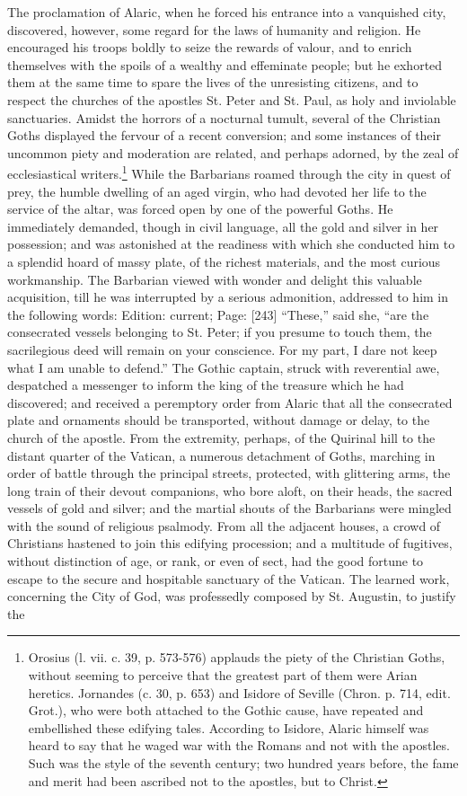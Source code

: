 The proclamation of Alaric, when he forced his entrance into a vanquished city, discovered, however, some regard for the laws of humanity and religion. He encouraged his troops boldly to seize the rewards of valour, and to enrich themselves with the spoils of a wealthy and effeminate people; but he exhorted them at the same time to spare the lives of the unresisting citizens, and to respect the churches of the apostles St. Peter and St. Paul, as holy and inviolable sanctuaries. Amidst the horrors of a nocturnal tumult, several of the Christian Goths displayed the fervour of a recent conversion; and some instances of their uncommon piety and moderation are related, and perhaps adorned, by the zeal of ecclesiastical writers.\footnote{Orosius (l. vii. c. 39, p. 573-576) applauds the piety of the Christian Goths, without seeming to perceive that the greatest part of them were Arian heretics. Jornandes (c. 30, p. 653) and Isidore of Seville (Chron. p. 714, edit. Grot.), who were both attached to the Gothic cause, have repeated and embellished these edifying tales. According to Isidore, Alaric himself was heard to say that he waged war with the Romans and not with the apostles. Such was the style of the seventh century; two hundred years before, the fame and merit had been ascribed not to the apostles, but to Christ.} While the Barbarians roamed through the city in quest of prey, the humble dwelling of an aged virgin, who had devoted her life to the service of the altar, was forced open by one of the powerful Goths. He immediately demanded, though in civil language, all the gold and silver in her possession; and was astonished at the readiness with which she conducted him to a splendid hoard of massy plate, of the richest materials, and the most curious workmanship. The Barbarian viewed with wonder and delight this valuable acquisition, till he was interrupted by a serious admonition, addressed to him in the following words: Edition: current; Page: [243] \texthebrew{“}These,\texthebrew{}” said she, \texthebrew{“}are the consecrated vessels belonging to St. Peter; if you presume to touch them, the sacrilegious deed will remain on your conscience. For my part, I dare not keep what I am unable to defend.\texthebrew{}” The Gothic captain, struck with reverential awe, despatched a messenger to inform the king of the treasure which he had discovered; and received a peremptory order from Alaric that all the consecrated plate and ornaments should be transported, without damage or delay, to the church of the apostle. From the extremity, perhaps, of the Quirinal hill to the distant quarter of the Vatican, a numerous detachment of Goths, marching in order of battle through the principal streets, protected, with glittering arms, the long train of their devout companions, who bore aloft, on their heads, the sacred vessels of gold and silver; and the martial shouts of the Barbarians were mingled with the sound of religious psalmody. From all the adjacent houses, a crowd of Christians hastened to join this edifying procession; and a multitude of fugitives, without distinction of age, or rank, or even of sect, had the good fortune to escape to the secure and hospitable sanctuary of the Vatican. The learned work, concerning the City of God, was professedly composed by St. Augustin, to justify the 